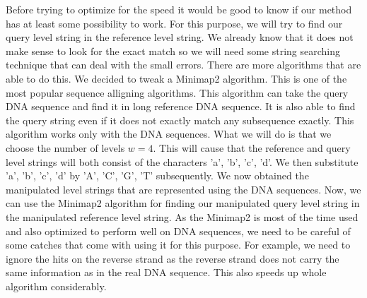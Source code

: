 Before trying to optimize for the speed it would be good to know if our method
has at least some possibility to work. For this purpose, we will try to
find our query level string in the reference level string. We already know that
it does not make sense to look for the exact match so we will need some string searching
technique that can deal with the small errors. There are more algorithms that are able
to do this. We decided to tweak a Minimap2 \cite{li2018minimap2} algorithm. This is
one of the most popular sequence alligning algorithms. This algorithm can take the
query DNA sequence and find it in long reference DNA sequence. It is also able to
find the query string even if it does not exactly match any subsequence exactly.
This algorithm works only with the DNA sequences. What we will do is that we choose
the number of levels $w=4$. This will cause that the reference and query level strings will both consist of
the characters 'a', 'b', 'c', 'd'. We then substitute 'a', 'b', 'c', 'd' by
'A', 'C', 'G', 'T' subsequently. We now obtained the manipulated level strings that
are represented using the DNA sequences. Now, we can use the Minimap2 algorithm for
finding our manipulated query level string in the manipulated reference level string.
As the Minimap2 is most of the time used and also optimized to perform well on DNA
sequences, we need to be careful of some catches that come with using it for this
purpose. For example, we need to ignore the hits on the reverse strand as the
reverse strand does not carry the same information as in the real DNA sequence.
This also speeds up whole algorithm considerably.


